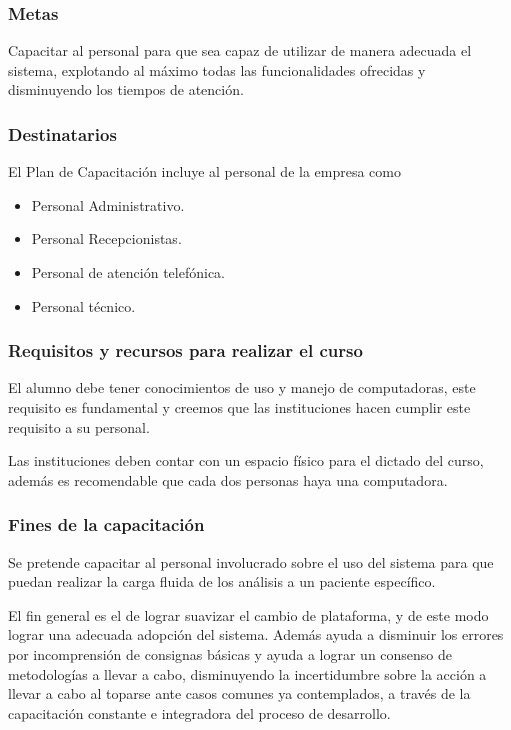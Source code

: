 \documentclass[a4paper,12pt]{article}
\begin{document}
\subsubsection{Metas}
Capacitar al personal para que sea capaz de utilizar de manera adecuada el sistema, explotando al máximo todas las funcionalidades ofrecidas y disminuyendo los tiempos de atención.


\subsubsection{Destinatarios}
El Plan de Capacitación incluye al personal de la empresa como
\begin{itemize}
	\item Personal Administrativo.
	\item Personal Recepcionistas.
	\item Personal de atención telefónica.
	\item Personal técnico.
\end{itemize}


\subsubsection{Requisitos y recursos para realizar el curso}
	El alumno debe tener conocimientos de uso y manejo de computadoras, este requisito es fundamental y creemos que las instituciones hacen cumplir este requisito a su personal.
	
	Las instituciones deben contar con un espacio físico para el dictado del curso, además es recomendable que cada dos personas haya una computadora.
	
\subsubsection{Fines de la capacitación}
Se pretende capacitar al personal involucrado sobre el uso del sistema para que puedan realizar la carga fluida de los análisis a un  paciente específico.

El fin general es el de  lograr suavizar el cambio de plataforma, y de este modo lograr una adecuada adopción del sistema. Además ayuda a disminuir los errores por incomprensión de consignas básicas y ayuda a lograr un consenso de metodologías a llevar a cabo, disminuyendo la incertidumbre  sobre la acción a llevar a cabo al toparse ante casos comunes ya contemplados, a través de la capacitación constante e integradora del  proceso de desarrollo.
\end{document}
